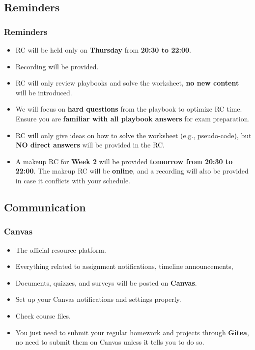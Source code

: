 \documentclass[
	11pt, %
]{beamer}
\begin{document}

\subsection{Reminders}

\begin{frame}
	\frametitle{Reminders}
 
	\begin{itemize}
    \item RC will be held only on \textbf{Thursday} from \textbf{20:30 to 22:00}.
    \item Recording will be provided.
    \item RC will only review playbooks and solve the worksheet, \textbf{no new content} will be introduced.
    \item We will focus on \textbf{hard questions} from the playbook to optimize RC time. Ensure you are \textbf{familiar with all playbook answers} for exam preparation.
    \item RC will only give ideas on how to solve the worksheet (e.g., pseudo-code), but \textbf{NO direct answers} will be provided in the RC.
    \item A makeup RC for \textbf{Week 2} will be provided \textbf{tomorrow from 20:30 to 22:00}. The makeup RC will be \textbf{online}, and a recording will also be provided in case it conflicts with your schedule.
\end{itemize}

\end{frame}



\subsection{Communication}

\begin{frame}
	\frametitle{Canvas}
 
	\begin{itemize}
    \item The official resource platform.
    \item Everything related to assignment notifications, timeline announcements, 
    \item Documents, quizzes, and surveys will be posted on \textbf{Canvas}.
    \item Set up your Canvas notifications and settings properly.
    \item Check course files.
    \item You just need to submit your regular homework and projects through \textbf{Gitea}, no need to submit them on Canvas unless it tells you to do so.
\end{itemize}

\end{frame}
\end{document}
